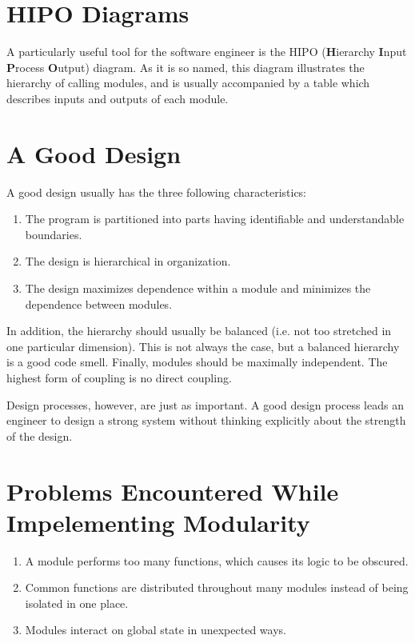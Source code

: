 \documentclass{designdoc}
\begin{document}
\section{HIPO Diagrams}
A particularly useful tool for the software engineer is the HIPO
({\bf H}ierarchy {\bf I}nput {\bf P}rocess {\bf O}utput) diagram. As it is so
named, this diagram illustrates the hierarchy of calling modules, and is
usually accompanied by a table which describes inputs and outputs of each
module.

\section{A Good Design}
A good design usually has the three following characteristics:
\begin{enumerate}
\item The program is partitioned into parts having identifiable and
  understandable boundaries.
\item The design is hierarchical in organization.
\item The design maximizes dependence within a module and minimizes the
  dependence between modules.
\end{enumerate}

In addition, the hierarchy should usually be balanced (i.e. not too stretched
in one particular dimension). This is not always the case, but a balanced
hierarchy is a good code smell. Finally, modules should be maximally
independent. The highest form of coupling is no direct coupling.

Design processes, however, are just as important. A good design process leads
an engineer to design a strong system without thinking explicitly about the
strength of the design.

\section{Problems Encountered While Impelementing Modularity}
\begin{enumerate}
\item A module performs too many functions, which causes its logic to be
  obscured.
\item Common functions are distributed throughout many modules instead of being
  isolated in one place.
\item Modules interact on global state in unexpected ways.
\end{enumerate}
\end{document}
